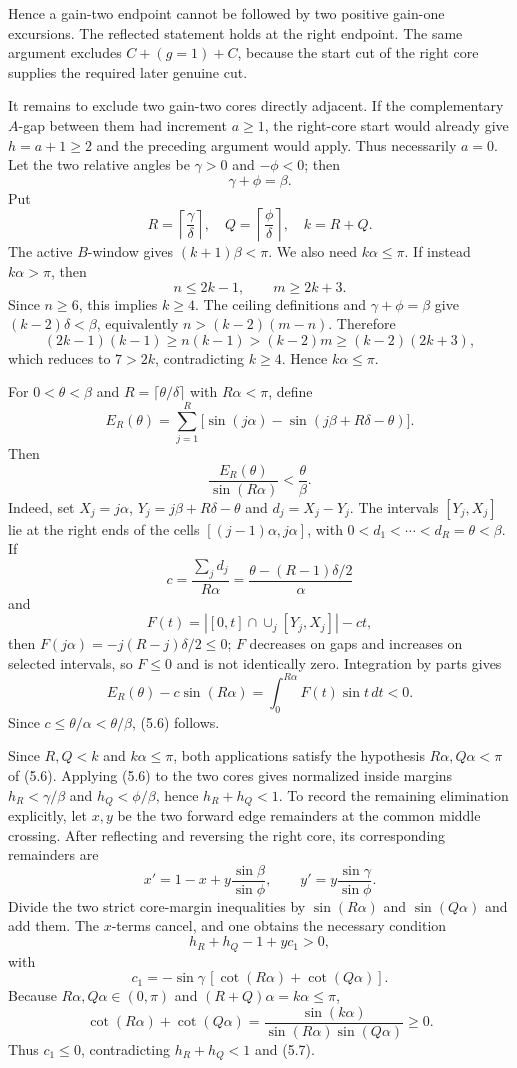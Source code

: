 \documentclass[11pt]{article}
\theoremstyle{remark}
\begin{document}
Hence a gain-two endpoint cannot be followed by two positive gain-one excursions. The reflected statement holds at the right endpoint. The same argument excludes $C+(g=1)+C$, because the start cut of the right core supplies the required later genuine cut.

It remains to exclude two gain-two cores directly adjacent. If the complementary $A$-gap between them had increment $a\ge1$, the right-core start would already give $h=a+1\ge2$ and the preceding argument would apply. Thus necessarily $a=0$. Let the two relative angles be $\gamma>0$ and $-\phi<0$; then
\[
\gamma+\phi=\beta.
\]
Put
\[
R=\left\lceil\frac{\gamma}{\delta}\right\rceil,
\quad
Q=\left\lceil\frac{\phi}{\delta}\right\rceil,
\quad k=R+Q.
\]
The active $B$-window gives $(k+1)\beta<\pi$. We also need $k\alpha\le\pi$. If instead $k\alpha>\pi$, then
\[
n\le2k-1,\qquad m\ge2k+3.
\]
Since $n\ge6$, this implies $k\ge4$. The ceiling definitions and $\gamma+\phi=\beta$ give $(k-2)\delta<\beta$, equivalently $n>(k-2)(m-n)$. Therefore
\[
(2k-1)(k-1)\ge n(k-1)>(k-2)m\ge(k-2)(2k+3),
\]
which reduces to $7>2k$, contradicting $k\ge4$. Hence $k\alpha\le\pi$.

For $0<\theta<\beta$ and $R=\lceil\theta/\delta\rceil$ with $R\alpha<\pi$, define
\[
E_R(\theta)=\sum_{j=1}^{R}\bigl[\sin(j\alpha)-\sin(j\beta+R\delta-\theta)\bigr].
\]
Then
\[
\boxed{\frac{E_R(\theta)}{\sin(R\alpha)}<\frac{\theta}{\beta}.}
\tag{5.6}
\]
Indeed, set $X_j=j\alpha$, $Y_j=j\beta+R\delta-\theta$ and $d_j=X_j-Y_j$. The intervals $[Y_j,X_j]$ lie at the right ends of the cells $[(j-1)\alpha,j\alpha]$, with $0<d_1<\cdots<d_R=\theta<\beta$. If
\[
c=\frac{\sum_jd_j}{R\alpha}
=\frac{\theta-(R-1)\delta/2}{\alpha}
\]
and
\[
F(t)=|[0,t]\cap\cup_j[Y_j,X_j]|-ct,
\]
then $F(j\alpha)=-j(R-j)\delta/2\le0$; $F$ decreases on gaps and increases on selected intervals, so $F\le0$ and is not identically zero. Integration by parts gives
\[
E_R(\theta)-c\sin(R\alpha)
=\int_0^{R\alpha}F(t)\sin t\,dt<0.
\]
Since $c\le\theta/\alpha<\theta/\beta$, (5.6) follows.

Since $R,Q<k$ and $k\alpha\le\pi$, both applications satisfy the hypothesis $R\alpha,Q\alpha<\pi$ of (5.6). Applying (5.6) to the two cores gives normalized inside margins $h_R<\gamma/\beta$ and $h_Q<\phi/\beta$, hence $h_R+h_Q<1$. To record the remaining elimination explicitly, let $x,y$ be the two forward edge remainders at the common middle crossing. After reflecting and reversing the right core, its corresponding remainders are
\[
x'=1-x+y\frac{\sin\beta}{\sin\phi},\qquad
y'=y\frac{\sin\gamma}{\sin\phi}.
\]
Divide the two strict core-margin inequalities by $\sin(R\alpha)$ and $\sin(Q\alpha)$ and add them. The $x$-terms cancel, and one obtains the necessary condition
\[
h_R+h_Q-1+y c_1>0,
\tag{5.7}
\]
with
\[
c_1=-\sin\gamma\,[\cot(R\alpha)+\cot(Q\alpha)].
\]
Because $R\alpha,Q\alpha\in(0,\pi)$ and $(R+Q)\alpha=k\alpha\le\pi$,
\[
\cot(R\alpha)+\cot(Q\alpha)
=\frac{\sin(k\alpha)}{\sin(R\alpha)\sin(Q\alpha)}\ge0.
\]
Thus $c_1\le0$, contradicting $h_R+h_Q<1$ and (5.7).
\end{document}
